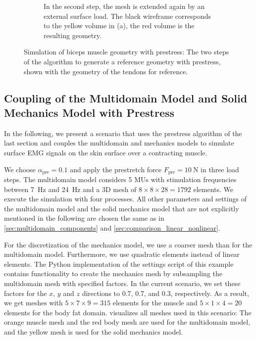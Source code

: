 \begin{figure}
\begin{subfigure}[t]{0.48\textwidth}
    \caption{In the second step, the mesh is extended again by an external surface load. The black wireframe corresponds to the yellow volume in (a), the red volume is the resulting geometry.}%
    \label{fig:neuromuscular_prestretch_2}%
  \end{subfigure}
  \hfill
  \caption{Simulation of biceps muscle geometry with prestress: The two steps of the algorithm to generate a reference geometry with prestress, shown with the geometry of the tendons for reference.}%
  \label{fig:neuromuscular_prestretch}%
\end{figure}%


\subsection{Coupling of the Multidomain Model and Solid Mechanics Model with Prestress}\label{sec:multidomain_contraction}

In the following, we present a scenario that uses the prestress algorithm of the last section and couples the multidomain and mechanics models to simulate surface EMG signals on the skin surface over a contracting muscle.

We choose $\alpha_\text{pre}=0.1$ and apply the prestretch force $F_\text{pre}=\SI{10}{\newton}$ in three load steps. The multidomain model considers 5 MUs with stimulation frequencies between \SI{7}{\hertz} and \SI{24}{\hertz} and a 3D mesh of $8 \times 8 \times 28 = 1792$ elements. We execute the simulation with four processes. All other parameters and settings of the multidomain model and the solid mechanics model that are not explicitly mentioned in the following are chosen the same as in \cref{sec:multidomain_components} and \cref{sec:comparison_linear_nonlinear}.

For the discretization of the mechanics model, we use a coarser mesh than for the multidomain model. Furthermore, we use quadratic elements instead of linear elements. The Python implementation of the settings script of this example contains functionality to create the mechanics mesh by subsampling the multidomain mesh with specified factors. In the current scenario, we set these factors for the $x$, $y$ and $z$ directions to 0.7, 0.7, and 0.3, respectively. As a result, we get meshes with $5 \times 7 \times 9 = 315$ elements for the muscle and $5 \times 1 \times 4 = 20$  elements for the body fat domain.  visualizes all meshes used in this scenario: The orange muscle mesh and the red body mesh are used for the multidomain model, and the yellow mesh is used for the solid mechanics model.


